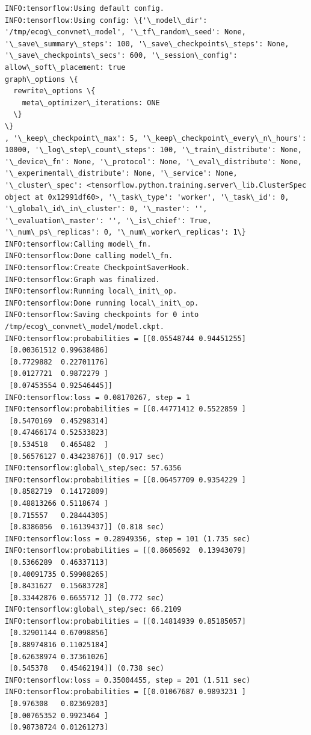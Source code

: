 \documentclass[11pt]{article}
\begin{document}
    \begin{Verbatim}[commandchars=\\\{\}]
INFO:tensorflow:Using default config.
INFO:tensorflow:Using config: \{'\_model\_dir': '/tmp/ecog\_convnet\_model', '\_tf\_random\_seed': None, '\_save\_summary\_steps': 100, '\_save\_checkpoints\_steps': None, '\_save\_checkpoints\_secs': 600, '\_session\_config': allow\_soft\_placement: true
graph\_options \{
  rewrite\_options \{
    meta\_optimizer\_iterations: ONE
  \}
\}
, '\_keep\_checkpoint\_max': 5, '\_keep\_checkpoint\_every\_n\_hours': 10000, '\_log\_step\_count\_steps': 100, '\_train\_distribute': None, '\_device\_fn': None, '\_protocol': None, '\_eval\_distribute': None, '\_experimental\_distribute': None, '\_service': None, '\_cluster\_spec': <tensorflow.python.training.server\_lib.ClusterSpec object at 0x12991df60>, '\_task\_type': 'worker', '\_task\_id': 0, '\_global\_id\_in\_cluster': 0, '\_master': '', '\_evaluation\_master': '', '\_is\_chief': True, '\_num\_ps\_replicas': 0, '\_num\_worker\_replicas': 1\}
INFO:tensorflow:Calling model\_fn.
INFO:tensorflow:Done calling model\_fn.
INFO:tensorflow:Create CheckpointSaverHook.
INFO:tensorflow:Graph was finalized.
INFO:tensorflow:Running local\_init\_op.
INFO:tensorflow:Done running local\_init\_op.
INFO:tensorflow:Saving checkpoints for 0 into /tmp/ecog\_convnet\_model/model.ckpt.
INFO:tensorflow:probabilities = [[0.05548744 0.94451255]
 [0.00361512 0.99638486]
 [0.7729882  0.22701176]
 [0.0127721  0.9872279 ]
 [0.07453554 0.92546445]]
INFO:tensorflow:loss = 0.08170267, step = 1
INFO:tensorflow:probabilities = [[0.44771412 0.5522859 ]
 [0.5470169  0.45298314]
 [0.47466174 0.52533823]
 [0.534518   0.465482  ]
 [0.56576127 0.43423876]] (0.917 sec)
INFO:tensorflow:global\_step/sec: 57.6356
INFO:tensorflow:probabilities = [[0.06457709 0.9354229 ]
 [0.8582719  0.14172809]
 [0.48813266 0.5118674 ]
 [0.715557   0.28444305]
 [0.8386056  0.16139437]] (0.818 sec)
INFO:tensorflow:loss = 0.28949356, step = 101 (1.735 sec)
INFO:tensorflow:probabilities = [[0.8605692  0.13943079]
 [0.5366289  0.46337113]
 [0.40091735 0.59908265]
 [0.8431627  0.15683728]
 [0.33442876 0.6655712 ]] (0.772 sec)
INFO:tensorflow:global\_step/sec: 66.2109
INFO:tensorflow:probabilities = [[0.14814939 0.85185057]
 [0.32901144 0.67098856]
 [0.88974816 0.11025184]
 [0.62638974 0.37361026]
 [0.545378   0.45462194]] (0.738 sec)
INFO:tensorflow:loss = 0.35004455, step = 201 (1.511 sec)
INFO:tensorflow:probabilities = [[0.01067687 0.9893231 ]
 [0.976308   0.02369203]
 [0.00765352 0.9923464 ]
 [0.98738724 0.01261273]

\end{Verbatim}
\end{document}
